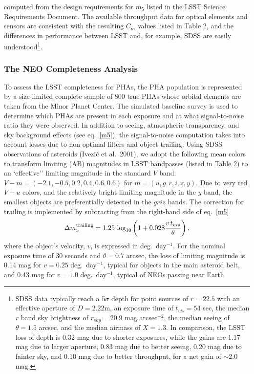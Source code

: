 \documentclass{emulateapj}
\newcommand{\B}[1]{{#1}}
\begin{document}
\B{computed from the design requirements for $m_5$ listed in the
LSST Science Requirements Document. The available throughput data for
optical elements and sensors are consistent with the resulting $C_m$ values 
listed in Table 2, and the differences in performance between LSST and,
for example, SDSS are easily understood\footnote{SDSS data 
typically reach a 5$\sigma$ depth for point sources of $r=22.5$ 
with an effective aperture of $D=2.22$m, an exposure time of $t_{vis}=54$ 
sec, the median $r$ band sky brightness of $r_{sky}=20.9$ mag arcsec$^{-2}$, 
the median seeing of $\theta=1.5$ arcsec, and the median airmass of $X=1.3$.
In comparison, the LSST loss of depth is 0.32 mag due to shorter exposures,
while the gains are 1.17 mag due to larger aperture, 0.83 mag due to better 
seeing, 0.20 mag due to fainter sky, and 0.10 mag due to better throughput,
for a net gain of $\sim$2.0 mag.}.}


\subsubsection{   The NEO Completeness Analysis    } 
\label{Sec:NEOc}
To assess the LSST completeness for PHAs, the PHA 
population is represented by a size-limited complete sample of 800 true
PHAs whose orbital elements are taken from the Minor Planet Center.
The simulated baseline survey is used to determine which PHAs are present in
each exposure and at what signal-to-noise ratio they were observed. In 
addition to  seeing, atmospheric transparency, and sky background effects
(see eq.~\ref{m5}), the signal-to-noise computation takes into account losses 
due to non-optimal filters and object trailing. Using SDSS observations
of asteroids (Ivezi\'c et al.~2001), we adopt the following mean colors to 
transform limiting (AB) magnitudes in LSST bandpasses (listed in Table 2)
to an `effective'' limiting magnitude in the standard $V$ band: 
$V-m=(-2.1, -0.5, 0.2, 0.4, 0.6, 0.6)$ for $m=(u,g,r,i,z,y)$. Due to 
very red $V-u$ colors, and the relatively bright limiting magnitude in the $y$ 
band, the smallest objects are preferentially detected in the $griz$ bands.
The correction for trailing is implemented by subtracting from the right-hand 
side of eq.~\ref{m5}
\begin{equation}
 \Delta m_5^{\rm trailing} = 1.25\,\log_{10}\left(1+0.028{v \,t_{vis} \over \theta}\right),
\end{equation}
where the object's velocity, $v$, is expressed in deg.~day$^{-1}$. For the nominal
exposure time of 30 seconds and $\theta=0.7$ arcsec, the loss of limiting 
magnitude is 0.14 mag for $v=0.25$ deg.~day$^{-1}$, typical for objects in the main 
asteroid belt, and 0.43 mag for $v=1.0$ deg.~day$^{-1}$, typical of NEOs passing
near Earth. 
\end{document}
